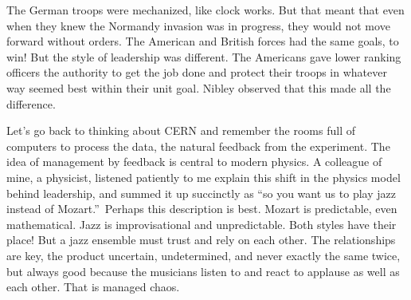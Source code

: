 \documentclass{article}
\begin{document}
The German troops were mechanized, like clock works. But that meant that
even when they knew the Normandy invasion was in progress, they would not
move forward without orders. The American and British forces had the same
goals, to win! But the style of leadership was different. The Americans gave
lower ranking officers the authority to get the job done and protect their
troops in whatever way seemed best within their unit goal.\cite{Nibley}
Nibley observed that this made all the difference.

Let's go back to thinking about CERN and remember the rooms full of
computers to process the data, the natural feedback from the experiment. The
idea of management by feedback is central to modern physics. A colleague of
mine, a physicist, listened patiently to me explain this shift in the
physics model behind leadership, and summed it up succinctly as
\textquotedblleft so you want us to play jazz instead of
Mozart.\textquotedblright\ Perhaps this description is best. Mozart is
predictable, even mathematical. Jazz is improvisational and unpredictable.
Both styles have their place! But a jazz ensemble must trust and rely on
each other. The relationships are key, the product uncertain, undetermined,
and never exactly the same twice, but always good because the musicians
listen to and react to applause as well as each other. That is managed chaos.



\end{document}
